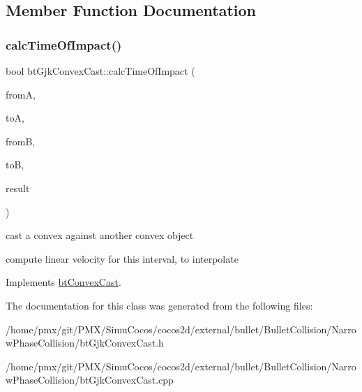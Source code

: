 \subsection{Member Function Documentation}
\mbox{\label{classbtGjkConvexCast_a814009e1ebc582495689f365a42ce2c1}} 
\subsubsection{\texorpdfstring{calc\+Time\+Of\+Impact()}{calcTimeOfImpact()}}
{\footnotesize\ttfamily bool bt\+Gjk\+Convex\+Cast\+::calc\+Time\+Of\+Impact (\begin{DoxyParamCaption}\item[{const bt\+Transform \&}]{fromA,  }\item[{const bt\+Transform \&}]{toA,  }\item[{const bt\+Transform \&}]{fromB,  }\item[{const bt\+Transform \&}]{toB,  }\item[{\hyperlink{structbtConvexCast_1_1CastResult}{Cast\+Result} \&}]{result }\end{DoxyParamCaption})\hspace{0.3cm}{\ttfamily [virtual]}}



cast a convex against another convex object 

compute linear velocity for this interval, to interpolate 

Implements \hyperlink{classbtConvexCast_abaf0f25a8cccfcafdaabada83c8d2bfb}{bt\+Convex\+Cast}.



The documentation for this class was generated from the following files\+:\begin{DoxyCompactItemize}
\item 
/home/pmx/git/\+P\+M\+X/\+Simu\+Cocos/cocos2d/external/bullet/\+Bullet\+Collision/\+Narrow\+Phase\+Collision/bt\+Gjk\+Convex\+Cast.\+h\item 
/home/pmx/git/\+P\+M\+X/\+Simu\+Cocos/cocos2d/external/bullet/\+Bullet\+Collision/\+Narrow\+Phase\+Collision/bt\+Gjk\+Convex\+Cast.\+cpp\end{DoxyCompactItemize}

